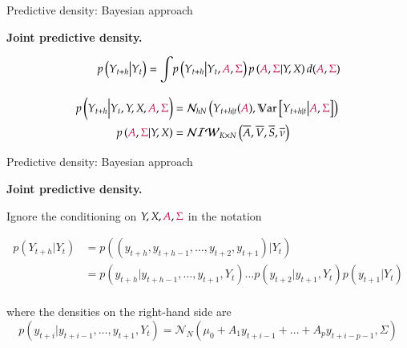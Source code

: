 \documentclass[notes,blackandwhite,mathsans,usenames,dvipsnames]{beamer}
\begin{document}
\begin{frame}{Predictive density: Bayesian approach}

\textbf{Joint predictive density.}

\begin{align*} 
p\left(Y_{t+h}\big|Y_t\right) = \int &p\left(Y_{t+h}\big|Y_t, {\color{purple}A},{\color{purple}\Sigma}\right)p\left( {\color{purple}A}, {\color{purple}\Sigma}|Y,X \right) d({\color{purple}A}, {\color{purple}\Sigma}) \\[2ex]
p\left(Y_{t+h}\Big|Y_t,Y,X, {\color{purple}A},{\color{purple}\Sigma}\right) &= \mathcal{N}_{hN}\left(Y_{t+h|t}({\color{purple}A}), \mathbb{V}\text{ar}\left[Y_{t+h|t}\big| {\color{purple}A},{\color{purple}\Sigma}\right]\right)\\
p\left( {\color{purple}A}, {\color{purple}\Sigma}|Y,X \right) &= \mathcal{NIW}_{K\times N}\left( \overline{A},\overline{V}, \overline{S}, \overline{\nu} \right)
\end{align*} 

\end{frame}




\begin{frame}{Predictive density: Bayesian approach}

\textbf{Joint predictive density.}

{\color{mcxs2}Ignore the conditioning on} $Y,X, {\color{purple}A},{\color{purple}\Sigma}$ {\color{mcxs2}in the notation}\small

\begin{align*} 
p\left(Y_{t+h}\big| Y_t\right) &= p\left(\left(y_{t+h}, y_{t+h-1}, \dots, y_{t+2}, y_{t+1}\right) \big| Y_t \right)\\
&= p\left( y_{t+h}\big|y_{t+h-1},\dots,y_{t+1}, Y_t \right) \dots p\left( y_{t+2}\big|y_{t+1}, Y_t \right)p\left( y_{t+1}\big| Y_t \right)\\
\end{align*} 

{\color{mcxs2}where the densities on the right-hand side are }
$$p\left( y_{t+i}\big|y_{t+i-1},\dots,y_{t+1}, Y_t \right) = \mathcal{N}_N\left(\mu_0 + A_1 y_{t+i-1}+\dots+A_py_{t+i-p-1}  ,\Sigma\right)$$

\end{frame}
\end{document}
